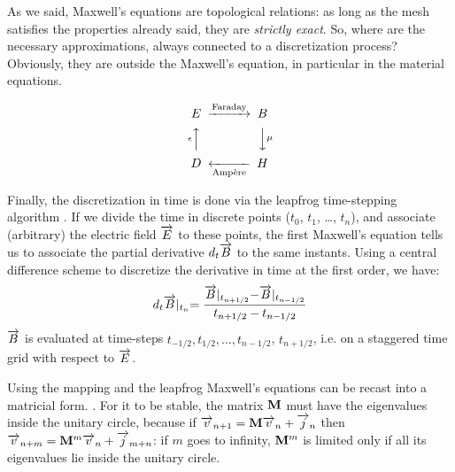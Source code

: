 As we said, Maxwell's equations are topological relations: as long as
the mesh satisfies the properties already said, they are
\emph{strictly exact}. So, where are the necessary approximations,
always connected to a discretization process? Obviously, they are
outside the Maxwell's equation, in particular in the material
equations.

$$
\begin{CD}
  E @>{\text{Faraday}}>> B \\
  @A{\epsilon}AA @VV{\mu}V \\
  D @<<{\text{Amp\`ere}}< H
\end{CD}
$$

Finally, the discretization in time is done via the leapfrog
time-stepping algorithm \cite{taflove_computational}. If we divide the
time in discrete points ($t_0$, $t_1$, \ldots, $t_n$), and associate (arbitrary)
the electric field $\overrightarrow{E}$ to these points, the first Maxwell's equation
tells us to associate the partial derivative $d_t \overrightarrow{B}$ to the same
instants. Using a central difference scheme to discretize the
derivative in time at the first order, we have:
$$
d_t \overrightarrow{B}\lvert_{t_n} = \frac{\overrightarrow{B}\lvert_{t_{n+1/2}} -
\overrightarrow{B}\lvert_{t_{n-1/2}}}{t_{n+1/2}-t_{n-1/2}}
$$
$\overrightarrow{B}$ is evaluated at time-steps $t_{-1/2}, t_{1/2}, \dotsc, t_{n-1/2}$,
$t_{n+1/2}$, i.e. on a staggered time grid with respect to $\overrightarrow{E}$.


Using the mapping and the leapfrog Maxwell's equations can be recast
into a matricial form. . For it to be stable, the
matrix $\mathbf{M}$ must have the eigenvalues inside the unitary
circle, because if $\overrightarrow{v}_{n+1} = \mathbf{M} \overrightarrow{v}_n +
\overrightarrow{j}_n$ then $\overrightarrow{v}_{n+m} = \mathbf{M}^{m} \overrightarrow{v}_{n} +
\overrightarrow{j}_{m+n}$: if $m$ goes to infinity, $\mathbf{M}^m$ is limited
only if all its eigenvalues lie inside the unitary circle.


